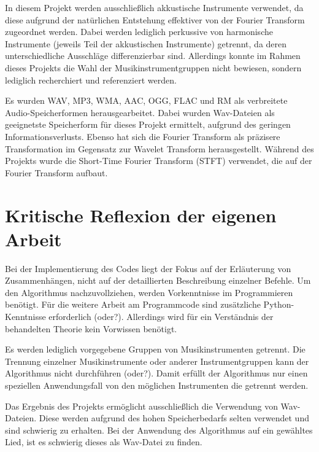 In diesem Projekt werden ausschließlich akkustische Instrumente verwendet, da diese aufgrund der natürlichen Entstehung effektiver von der Fourier Transform zugeordnet werden.
Dabei werden lediglich perkussive von harmonische Instrumente (jeweils Teil der akkustischen Instrumente) getrennt, da deren unterschiedliche Ausschläge differenzierbar sind.
Allerdings konnte im Rahmen dieses Projekts die Wahl der Musikinstrumentgruppen nicht bewiesen, sondern lediglich recherchiert und referenziert werden.

\par

Es wurden WAV, MP3, WMA, AAC, OGG, FLAC und RM als verbreitete Audio-Speicherformen herausgearbeitet.
Dabei wurden Wav-Dateien als geeignetste Speicherform für dieses Projekt ermittelt, aufgrund des geringen Informationsverlusts.
Ebenso hat sich die Fourier Transform als präzisere Transformation im Gegensatz zur Wavelet Transform herausgestellt.
Während des Projekts wurde die Short-Time Fourier Transform (STFT) verwendet, die auf der Fourier Transform aufbaut.

%
\section{Kritische Reflexion der eigenen Arbeit}
%

Bei der Implementierung des Codes liegt der Fokus auf der Erläuterung von Zusammenhängen, nicht auf der detaillierten Beschreibung einzelner Befehle.
Um den Algorithmus nachzuvollziehen, werden Vorkenntnisse im Programmieren benötigt.
Für die weitere Arbeit am Programmcode sind zusätzliche Python-Kenntnisse erforderlich (oder?).
Allerdings wird für ein Verständnis der behandelten Theorie kein Vorwissen benötigt.

\par

Es werden lediglich vorgegebene Gruppen von Musikinstrumenten getrennt.
Die Trennung einzelner Musikinstrumente oder anderer Instrumentgruppen kann der Algorithmus nicht durchführen (oder?).
Damit erfüllt der Algorithmus nur einen speziellen Anwendungsfall von den möglichen Instrumenten die getrennt werden.

\par

Das Ergebnis des Projekts ermöglicht ausschließlich die Verwendung von Wav-Dateien.
Diese werden aufgrund des hohen Speicherbedarfs selten verwendet und sind schwierig zu erhalten.
Bei der Anwendung des Algorithmus auf ein gewähltes Lied, ist es schwierig dieses als Wav-Datei zu finden.

